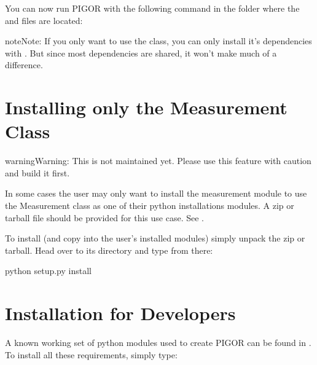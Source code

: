 \documentclass[letterpaper,10pt,english]{sphinxmanual}
\begin{document}
You can now run PIGOR with the following command in the folder where the  and  files are located:

\begin{sphinxVerbatim}[commandchars=\\\{\}]
 
\end{sphinxVerbatim}

\begin{sphinxadmonition}{note}{Note:}
If you only want to use the {\hyperref[\detokenize{measurement:measurement.Measurement}]{}} class, you can only install it’s dependencies with . But since most dependencies are shared, it won’t make much of a difference.
\end{sphinxadmonition}


\section{Installing only the Measurement Class}
\label{\detokenize{installation:installing-only-the-measurement-class}}
\begin{sphinxadmonition}{warning}{Warning:}
This is not maintained yet. Please use this feature with caution and build it first.
\end{sphinxadmonition}

In some cases the user may only want to install the measurement module to use the Measurement class as one of their python installations modules. A zip or tarball file should be provided for this use case. See .

To install (and copy into the user’s installed modules) simply unpack the zip or tarball. Head over to its directory and type from there:

\begin{sphinxVerbatim}[commandchars=\\\{\}]
python setup.py install
\end{sphinxVerbatim}


\section{Installation for Developers}
\label{\detokenize{installation:installation-for-developers}}
A known working set of python modules used to create PIGOR can be found in . To install all these requirements, simply type:
\end{document}
